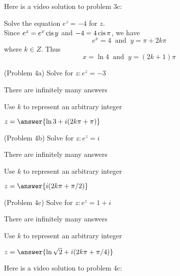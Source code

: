 \documentclass[handout]{ximera}
\begin{document}
Here is a video solution to problem 3c:\\
\begin{foldable}
\end{foldable}


\begin{example}[Example 4] 
Solve the equation $e^z = -4$ for $z$.\\
Since $e^z = e^x \operatorname{cis} y$ and $-4 = 4\operatorname{cis} \pi$,
we have 
\[
e^x = 4 \;\; \mbox{and} \;\; y = \pi+2k\pi
\]
where $k \in Z$. Thus
\[
x = \ln 4 \;\; \mbox{and} \;\; y = (2k+1)\pi
\]
\end{example}



\begin{problem}(Problem 4a)
Solve for $z: e^z = -3$\\
\begin{hint}
There are infinitely many answers
\end{hint}
\begin{hint}
Use $k$ to represent an arbitrary integer
\end{hint}
$z = \answer{\ln 3 + i(2k\pi + \pi)}$
\end{problem}


\begin{problem}(Problem 4b)
Solve for $z: e^z = i$\\
\begin{hint}
There are infinitely many answers
\end{hint}
\begin{hint}
Use $k$ to represent an arbitrary integer
\end{hint}
$z = \answer{i(2k\pi + \pi/2)}$
\end{problem}


\begin{problem}(Problem 4c)
Solve for $z: e^z = 1+i$\\
\begin{hint}
There are infinitely many answers
\end{hint}
\begin{hint}
Use $k$ to represent an arbitrary integer
\end{hint}
$z = \answer{\ln \sqrt 2 +i(2k\pi + \pi/4)}$
\end{problem}

Here is a video solution to problem 4c:\\
\begin{foldable}
\end{foldable}
\end{document}
